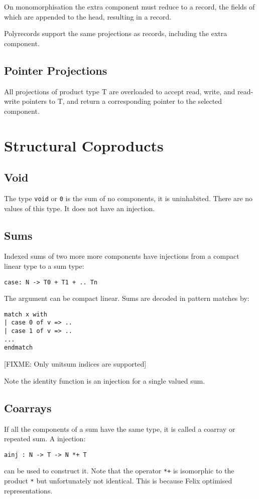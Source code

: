 \documentclass[oneside]{book}
\begin{document}
On monomorphisation the extra component must reduce to a record,
the fields of which are appended to the head, resulting in a record.

Polyrecords support the same projections as records, including
the extra component.

\subsection{Pointer Projections}
All projections of product type T are overloaded to accept
read, write, and read-write pointers to T, and return a corresponding
pointer to the selected component.

\section{Structural Coproducts}
\subsection{Void}
The type \verb$void$ or \verb$0$ is the sum of no components, it is
uninhabited. There are no values of this type. It does not have
an injection.

\subsection{Sums}
Indexed sums of two more more components have injections from a compact linear type to a sum type:
\begin{verbatim}
case: N -> T0 + T1 + .. Tn
\end{verbatim}
The argument can be compact linear. Sums are decoded in pattern matches by:
\begin{verbatim}
match x with
| case 0 of v => ..
| case 1 of v => ..
...
endmatch
\end{verbatim}
[FIXME: Only unitsum indices are supported]

Note the identity function is an injection for a single valued sum.

\subsection{Coarrays}
If all the components of a sum have the same type, it is called
a coarray or repeated sum. A injection:

\begin{verbatim}
ainj : N -> T -> N *+ T
\end{verbatim}
can be used to construct it. Note that the operator \verb$*+$ is isomorphic to
the product \verb$*$ but unfortunately not identical. This is because Felix
optimised representations.
\end{document}
